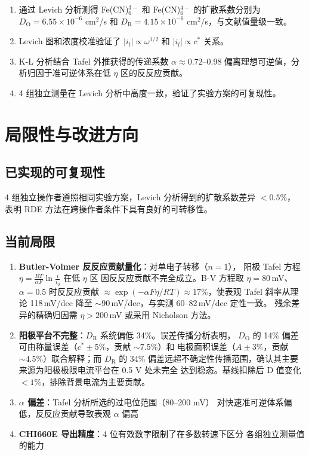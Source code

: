 \documentclass[12pt,a4paper]{ctexart}
\begin{document}
\begin{enumerate}[leftmargin=1.5cm]
  \item 通过 Levich 分析测得 Fe(CN)$_6^{3-}$ 和 Fe(CN)$_6^{4-}$ 的扩散系数分别为
  $D_{\text{O}} = 6.55 \times 10^{-6}$ cm$^2$/s 和
  $D_{\text{R}} = 4.15 \times 10^{-6}$ cm$^2$/s，与文献值量级一致。
  \item Levich 图和浓度校准验证了 $|i_l| \propto \omega^{1/2}$ 和 $|i_l| \propto c^*$ 关系。
  \item K-L 分析结合 Tafel 外推获得的传递系数 $\alpha \approx 0.72$--$0.98$
  偏离理想可逆值，分析归因于准可逆体系在低 $\eta$ 区的反反应贡献。
  \item 4 组独立测量在 Levich 分析中高度一致，验证了实验方案的可复现性。
\end{enumerate}

\newpage

\section{局限性与改进方向}

\subsection{已实现的可复现性}

4 组独立操作者遵照相同实验方案，Levich 分析得到的扩散系数差异 $< 0.5\%$，
表明 RDE 方法在跨操作者条件下具有良好的可转移性。

\subsection{当前局限}

\begin{enumerate}[leftmargin=1.5cm]
  \item \textbf{Butler-Volmer 反反应贡献量化}：对单电子转移（$n=1$），
  阳极 Tafel 方程 $\eta = \frac{RT}{\alpha F}\ln\frac{i}{i_0}$ 在低 $\eta$ 区
  因反反应贡献不完全成立。B-V 方程取 $\eta=80$\,mV、$\alpha=0.5$ 时反反应贡献
  $\approx \exp(-\alpha F\eta/RT) \approx 17\%$，使表观 Tafel 斜率从理论
  118\,mV/dec 降至 $\sim 90$\,mV/dec，与实测 60--82\,mV/dec 定性一致。
  残余差异的精确归因需 $\eta > 200$\,mV 或采用 Nicholson 方法\cite{nicholson1965}。
  \item \textbf{阳极平台不完整}：$D_{\text{R}}$ 系统偏低 34\%。误差传播分析表明，
  $D_{\text{O}}$ 的 14\% 偏差可由称量误差（$c^* \pm 5\%$，贡献 $\sim 7.5\%$）和
  电极面积误差（$A \pm 3\%$，贡献 $\sim 4.5\%$）联合解释；而 $D_{\text{R}}$ 的
  34\% 偏差远超不确定性传播范围，确认其主要来源为阳极极限电流平台在 0.5 V 处未完全
  达到稳态。基线扣除后 D 值变化 $< 1\%$，排除背景电流为主要贡献。
  \item \textbf{$\alpha$ 偏差}：Tafel 分析所选的过电位范围（80--200 mV）
  对快速准可逆体系偏低，反反应贡献导致表观 $\alpha$ 偏高
  \item \textbf{CHI660E 导出精度}：4 位有效数字限制了在多数转速下区分
  各组独立测量值的能力
\end{enumerate}
\end{document}
